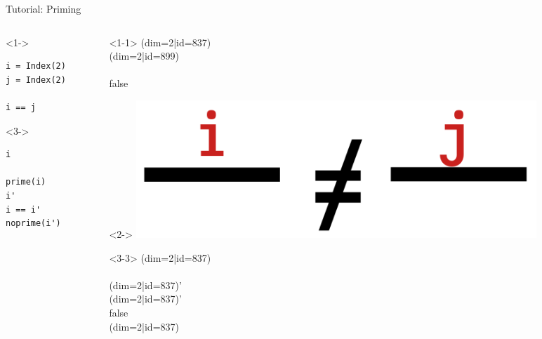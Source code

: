 \begin{frame}[fragile]{Tutorial: Priming}

\begin{columns}

\begin{column}{4.5cm}

\begin{onlyenv}<1->
\begin{lstlisting}[language=JuliaLocal, style=julia, basicstyle=\small]
i = Index(2)
j = Index(2)

i == j
\end{lstlisting}
\end{onlyenv}

\begin{onlyenv}<3->
\begin{lstlisting}[language=JuliaLocal, style=julia, basicstyle=\small]
i

prime(i)
i'
i == i'
noprime(i')
\end{lstlisting}
\end{onlyenv}

\end{column}

\begin{column}{4.5cm}

\begin{onlyenv}<1-1>
(dim=2|id=837) \\
(dim=2|id=899) \\
~\\
false \\
\end{onlyenv}

\begin{onlyenv}<2->
\includegraphics[width=0.8\textwidth]{
  slides/assets/i_neq_j.png
}
\vspace*{1.0cm}
\end{onlyenv}

\begin{onlyenv}<3-3>
(dim=2|id=837) \\
~\\
(dim=2|id=837)' \\
(dim=2|id=837)' \\
false \\
(dim=2|id=837)
\end{onlyenv}


\end{column}
\end{columns}
\end{frame}
